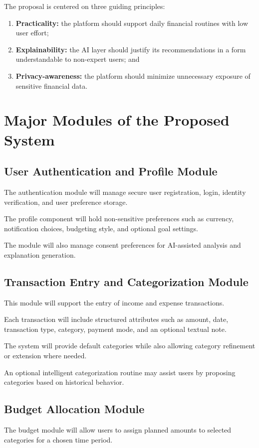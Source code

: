 \documentclass[12pt,a4paper]{report}
\begin{document}
The proposal is centered on three guiding principles:
\begin{enumerate}[label=\arabic*.]
\item \textbf{Practicality:}
the platform should support daily financial routines with low user effort;
\item \textbf{Explainability:}
the AI layer should justify its recommendations in a form understandable to non-expert users; and
\item \textbf{Privacy-awareness:}
the platform should minimize unnecessary exposure of sensitive financial data.
\end{enumerate}

\section{Major Modules of the Proposed System}
\subsection{User Authentication and Profile Module}
The authentication module will manage secure user registration,
login,
identity verification,
and user preference storage.

The profile component will hold non-sensitive preferences such as currency,
notification choices,
budgeting style,
and optional goal settings.

The module will also manage consent preferences for AI-assisted analysis and explanation generation.

\subsection{Transaction Entry and Categorization Module}
This module will support the entry of income and expense transactions.

Each transaction will include structured attributes such as amount,
date,
transaction type,
category,
payment mode,
and an optional textual note.

The system will provide default categories while also allowing category refinement or extension where needed.

An optional intelligent categorization routine may assist users by proposing categories based on historical behavior.

\subsection{Budget Allocation Module}
The budget module will allow users to assign planned amounts to selected categories for a chosen time period.
\end{document}
